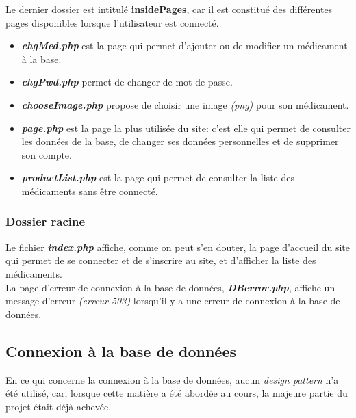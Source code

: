 \newpage

Le dernier dossier est intitulé \textbf{insidePages}, car il est constitué des différentes pages disponibles lorsque l'utilisateur est connecté.

\begin{itemize}
    
    \item \textbf{\textit{chgMed.php}} est la page qui permet d’ajouter ou de modifier un médicament à la base.
    
    \item \textbf{\textit{chgPwd.php}} permet de changer de mot de passe.
    
    \item \textbf{\textit{chooseImage.php}} propose de choisir une image \textit{(png)} pour son médicament.
    
    \item \textbf{\textit{page.php}} est la page la plus utilisée du site: c’est elle qui permet de consulter les données de la base, de changer ses données personnelles et de supprimer son compte.
    
    \item \textbf{\textit{productList.php}} est la page qui permet de consulter la liste des médicaments sans être connecté.
    
\end{itemize}


\subsubsection{Dossier racine}
\label{sec:folder-root}

Le fichier \textbf{\textit{index.php}} affiche, comme on peut s’en douter, la page d’accueil du site qui permet de se connecter et de s’inscrire au site, et d’afficher la liste des médicaments.\\

La page d’erreur de connexion à la base de données, \textbf{\textit{DBerror.php}}, affiche un message d’erreur \textit{(erreur 503)} lorsqu’il y a une erreur de connexion à la base de données.

\newpage


\subsection{Connexion à la base de données}
\label{sec:conn-bd}

En ce qui concerne la connexion à la base de données, aucun \textit{design pattern} n’a été utilisé, car, lorsque cette matière a été abordée au cours, la majeure partie du projet était déjà achevée.\\

